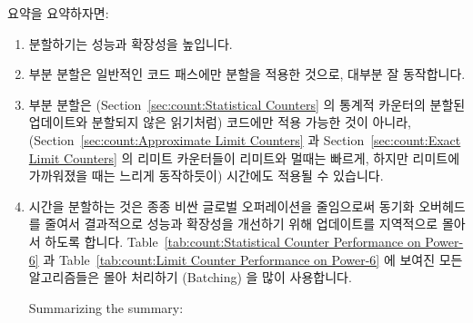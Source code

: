 \begin{lineref}
요약을 요약하자면:

\begin{enumerate}
\item	분할하기는 성능과 확장성을 높입니다.
\item	부분 분할은 일반적인 코드 패스에만 분할을 적용한 것으로, 대부분 잘
	동작합니다.
\item	부분 분할은 (Section~\ref{sec:count:Statistical Counters} 의 통계적
	카운터의 분할된 업데이트와 분할되지 않은 읽기처럼) 코드에만 적용 가능한
	것이 아니라, (Section~\ref{sec:count:Approximate Limit Counters} 과
	Section~\ref{sec:count:Exact Limit Counters} 의 리미트 카운터들이
	리미트와 멀때는 빠르게, 하지만 리미트에 가까워졌을 때는 느리게
	동작하듯이) 시간에도 적용될 수 있습니다.
\item	시간을 분할하는 것은 종종 비싼 글로벌 오퍼레이션을 줄임으로써 동기화
	오버헤드를 줄여서 결과적으로 성능과 확장성을 개선하기 위해 업데이트를
	지역적으로 몰아서 하도록 합니다.
	Table~\ref{tab:count:Statistical Counter Performance on Power-6} 과
	Table~\ref{tab:count:Limit Counter Performance on Power-6} 에 보여진
	모든 알고리즘들은 몰아 처리하기 (Batching) 을 많이 사용합니다.
\iffalse

Summarizing the summary:


\end{enumerate}
\end{lineref}
